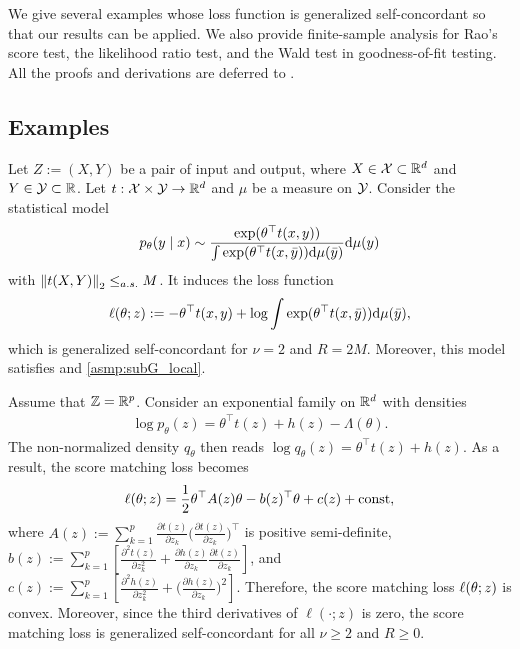 We give several examples whose loss function is generalized self-concordant so that our results can be applied.
We also provide finite-sample analysis for Rao's score test, the likelihood ratio test, and the Wald test in goodness-of-fit testing.
All the proofs and derivations are deferred to .

\subsection{Examples}
\label{sub:examples}

\begin{example}\label{ex:glm}
    Let $Z := (X, Y)$ be a pair of input and output, where $X \in \mathcal{X} \subset {\mathbb R}^d$ and $Y \in \mathcal{Y} \subset {\mathbb R}$.
    Let $t: \mathcal{X} \times \mathcal{Y} \rightarrow {\mathbb R}^d$ and $\mu$ be a measure on $\mathcal{Y}$.
    Consider the statistical model
    \begin{align*}
        p_\theta(y \mid x) \sim \frac{\exp(\theta^\top t(x, y))}{\int \exp(\theta^\top t(x, \bar y)) \mathrm{d} \mu(\bar y)} \mathrm{d} \mu(y)
    \end{align*}
    with $\left\lVert t(X, Y) \right\rVert_2 \le_{a.s.} M$.
    It induces the loss function
    \begin{align*}
        \ell(\theta; z) := -\theta^\top t(x, y) + \log{\int \exp(\theta^\top t(x, \bar y)) \mathrm{d}\mu(\bar y)},
    \end{align*}
    which is generalized self-concordant for $\nu = 2$ and $R = 2M$.
    Moreover, this model satisfies  and \ref{asmp:subG_local}.
\end{example}


\begin{example}\label{ex:score_matching}
    Assume that $\mathbb{Z} = {\mathbb R}^p$.
    Consider an exponential family on ${\mathbb R}^d$ with densities
    \begin{align*}
        \log{p_\theta(z)} = \theta^\top t(z) + h(z) - \Lambda(\theta).
    \end{align*}
    The non-normalized density $q_\theta$ then reads $\log{q_\theta(z)} = \theta^\top t(z) + h(z)$.
    As a result, the score matching loss becomes
    \begin{align*}
        \ell(\theta; z) = \frac12 \theta^\top A(z) \theta - b(z)^\top \theta + c(z) + \text{const},
    \end{align*}
    where $A(z) := \sum_{k=1}^p \frac{\partial t(z)}{\partial z_k} \big(\frac{\partial t(z)}{\partial z_k}\big)^\top$ is positive semi-definite, $b(z) := \sum_{k=1}^p \left[ \frac{\partial^2 t(z)}{\partial z_k^2} + \frac{\partial h(z)}{\partial z_k} \frac{\partial t(z)}{\partial z_k} \right]$, and $c(z) := \sum_{k=1}^p \left[ \frac{\partial^2 h(z)}{\partial z_k^2} + \big(\frac{\partial h(z)}{\partial z_k}\big)^2 \right]$.
    Therefore, the score matching loss $\ell(\theta; z)$ is convex.
    Moreover, since the third derivatives of $\ell(\cdot; z)$ is zero, the score matching loss is generalized self-concordant for all $\nu \ge 2$ and $R \ge 0$.
\end{example}

